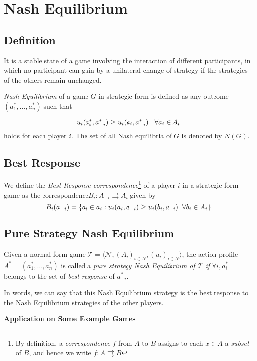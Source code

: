 \section {Nash Equilibrium}

\subsection{Definition}
It is a stable state of a game involving the interaction of different participants, in which no participant can gain by a unilateral change of strategy if the strategies of the others remain unchanged. \\

\begin{flushleft}\textit{Nash Equilibrium} of a game $G$ in strategic form is defined as any outcome $(a^*_1, \dots , a^*_n)$ such that \end{flushleft}$$u_i(a^*_i, a^*_{-i}) \geq u_i(a_i, a^*_{-i})\hspace{0.3cm} \forall a_i \in A_i$$ holds for each player $i$. The set of all Nash equilibria of $G$ is denoted by $N(G)$.

\subsection{Best Response}
We define the \textit{Best Response correspondence}\footnote{By definition, a \textit{correspondence} $f$ from $A$ to $B$ assigns to each $x \in A$ a \textit{subset} of $B$, and hence we write $f: A \rightrightarrows B$} of a player $i$ in a strategic form game as the correspondence$B_i : A_{-i} \rightrightarrows A_i$ given by $$B_i(a_{-i}) = \{a_i \in a_i: u_i(a_i, a_{-i}) \geq u_i(b_i, a_{-i})\hspace{0.2cm} \forall b_i \in A_i\} $$

\subsection{Pure Strategy Nash Equilibrium}
Given a normal form game $\mathcal{T} = \langle \mathcal{N}, (A_i)_{i \in N}, (u_i)_{i \in N}\rangle$, the action profile $A^* = (a^*_1, \dots , a^*_n)$ is called a \textit{pure strategy Nash Equilibrium of $\mathcal{T}$ if} $\forall i, a^*_i$ belongs to the set of \textit{best response } of $a^*_{-i}$.

\begin{flushleft}In words, we can say that this Nash Equilibrium strategy is the best response to the Nash Equilibrium strategies of the other players. \newline

\begin{large}\textbf{Application on Some Example Games}\end{large}\end{flushleft}

